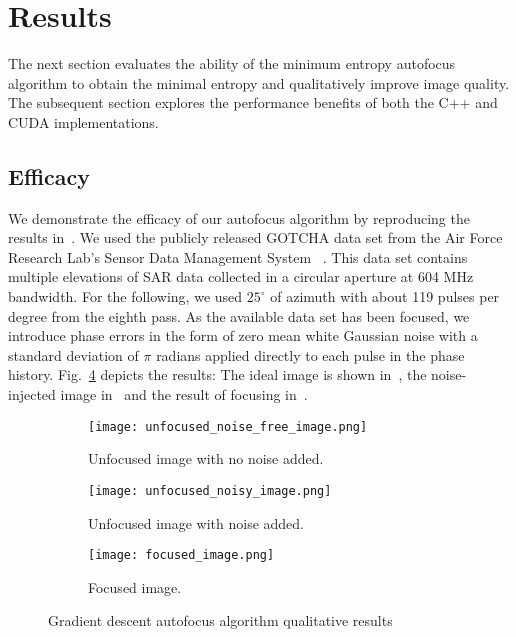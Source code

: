 \section{Results}\label{sec:results}

The next section evaluates the ability of the minimum entropy autofocus
algorithm to obtain the minimal entropy and qualitatively improve image quality.
The subsequent section explores the performance benefits of both the C++ and
CUDA implementations.

\subsection{Efficacy}

We demonstrate the efficacy of our autofocus algorithm by reproducing the
results in~\cite{ash2012autofocus}. We used the publicly released GOTCHA data
set from the Air Force Research Lab's Sensor Data Management System
~\cite{gotcha}. This data set contains multiple elevations of SAR data collected
in a circular aperture at 604 MHz bandwidth. For the following, we used
$25^{\circ}$ of azimuth with about 119 pulses per degree from the eighth pass.
As the available data set has been focused, we introduce phase errors in the
form of zero mean white Gaussian noise with a standard deviation of $\pi$
radians applied directly to each pulse in the phase history.
Fig.~\ref{fig:efficacy} depicts the results: The ideal image is shown
in~, the noise-injected image in~ and the
result of focusing in~.

\begin{figure}
  \centering
  \begin{subfigure}{0.5\textwidth}
    \centering
    \texttt{[image: unfocused\_noise\_free\_image.png]}
    \caption{Unfocused image with no noise added.}
    \label{fig:ideal}
  \end{subfigure}
  \vfill
  \begin{subfigure}{0.5\textwidth}
    \centering
    \texttt{[image: unfocused\_noisy\_image.png]}
    \caption{Unfocused image with noise added.}
    \label{fig:unfocused}
  \end{subfigure}
  \vfill
  \begin{subfigure}{0.5\textwidth}
    \centering
    \texttt{[image: focused\_image.png]}
    \caption{Focused image.}
    \label{fig:focused}
  \end{subfigure}
  \vspace{5 mm}
  \caption{Gradient descent autofocus algorithm qualitative results}
  \label{fig:efficacy}
\end{figure}

